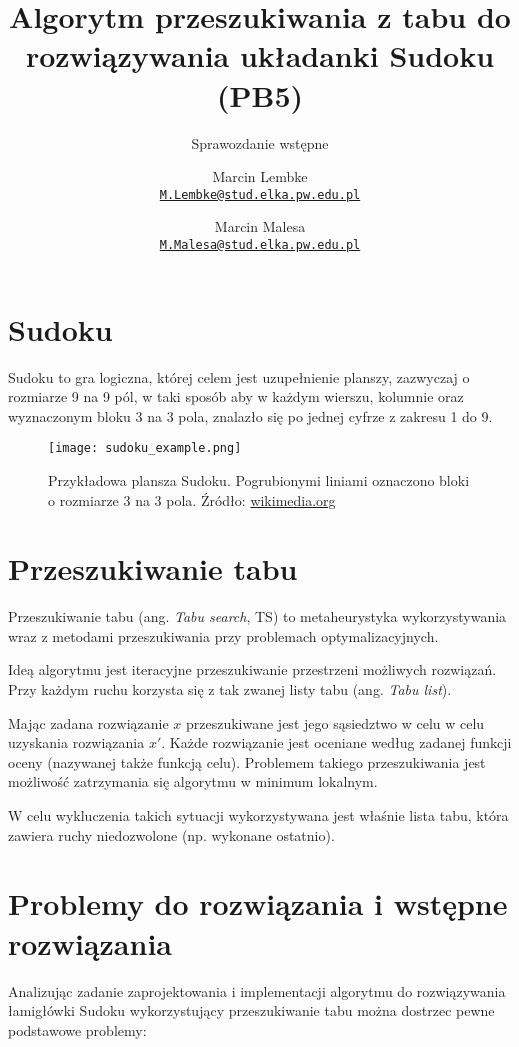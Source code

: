 \documentclass[]{project_report}
\author{%
	Marcin Lembke\\
	\texttt{\href{mailto:M.Lembke@stud.elka.pw.edu.pl}%
			{\nolinkurl{M.Lembke@stud.elka.pw.edu.pl}}}
	\and
	Marcin Malesa\\
	\texttt{\href{mailto:M.Malesa@stud.elka.pw.edu.pl}%
			{\nolinkurl{M.Malesa@stud.elka.pw.edu.pl}}}
}
\title{Algorytm przeszukiwania z tabu do rozwiązywania układanki Sudoku (PB5)}
\subtitle{Sprawozdanie wstępne}
\begin{document}
	\maketitle
	
	\section{Sudoku}
	Sudoku to gra logiczna, której celem jest uzupełnienie planszy, zazwyczaj o rozmiarze 9 na 9 pól, w taki sposób aby w każdym wierszu, kolumnie oraz wyznaczonym bloku 3 na 3 pola, znalazło się po jednej cyfrze z zakresu 1 do 9.
	
	\begin{figure}[H]
		\centering
		\texttt{[image: sudoku\_example.png]}
		\caption{Przykładowa plansza Sudoku. Pogrubionymi liniami oznaczono bloki o rozmiarze 3 na 3 pola. Źródło: \href{https://upload.wikimedia.org/wikipedia/commons/2/2d/Sudoku_przyklad.png}{wikimedia.org}}
	\end{figure}
	
	\section{Przeszukiwanie tabu}
	Przeszukiwanie tabu (ang. \textit{Tabu search}, TS) to metaheurystyka wykorzystywania wraz z metodami przeszukiwania przy problemach optymalizacyjnych.
	
	Ideą algorytmu jest iteracyjne przeszukiwanie przestrzeni możliwych rozwiązań. Przy każdym ruchu korzysta się z tak zwanej listy tabu (ang. \textit{Tabu list}).
	
	Mając zadana rozwiązanie \(x\) przeszukiwane jest jego sąsiedztwo w celu w celu uzyskania rozwiązania \(x'\). Każde rozwiązanie jest oceniane według zadanej funkcji oceny (nazywanej także funkcją celu). Problemem takiego przeszukiwania jest możliwość zatrzymania się algorytmu w minimum lokalnym.
	
	W celu wykluczenia takich sytuacji wykorzystywana jest właśnie lista tabu, która zawiera ruchy niedozwolone (np. wykonane ostatnio).
	
	\section{Problemy do rozwiązania i wstępne rozwiązania}
	Analizując zadanie zaprojektowania i implementacji algorytmu do rozwiązywania łamigłówki Sudoku wykorzystujący przeszukiwanie tabu można dostrzec pewne podstawowe problemy:
	
\end{document}
